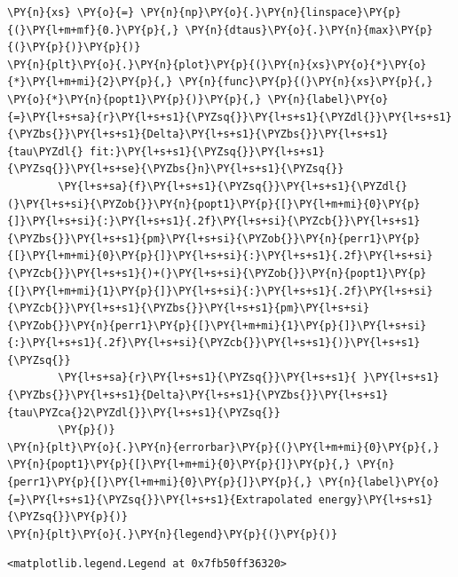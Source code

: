 \begin{tcolorbox}[breakable, size=fbox, boxrule=1pt, pad at break*=1mm,colback=cellbackground, colframe=cellborder]
\begin{Verbatim}[commandchars=\\\{\}]
\PY{n}{xs} \PY{o}{=} \PY{n}{np}\PY{o}{.}\PY{n}{linspace}\PY{p}{(}\PY{l+m+mf}{0.}\PY{p}{,} \PY{n}{dtaus}\PY{o}{.}\PY{n}{max}\PY{p}{(}\PY{p}{)}\PY{p}{)}
\PY{n}{plt}\PY{o}{.}\PY{n}{plot}\PY{p}{(}\PY{n}{xs}\PY{o}{*}\PY{o}{*}\PY{l+m+mi}{2}\PY{p}{,} \PY{n}{func}\PY{p}{(}\PY{n}{xs}\PY{p}{,} \PY{o}{*}\PY{n}{popt1}\PY{p}{)}\PY{p}{,} \PY{n}{label}\PY{o}{=}\PY{l+s+sa}{r}\PY{l+s+s1}{\PYZsq{}}\PY{l+s+s1}{\PYZdl{}}\PY{l+s+s1}{\PYZbs{}}\PY{l+s+s1}{Delta}\PY{l+s+s1}{\PYZbs{}}\PY{l+s+s1}{tau\PYZdl{} fit:}\PY{l+s+s1}{\PYZsq{}}\PY{l+s+s1}{\PYZsq{}}\PY{l+s+se}{\PYZbs{}n}\PY{l+s+s1}{\PYZsq{}}
        \PY{l+s+sa}{f}\PY{l+s+s1}{\PYZsq{}}\PY{l+s+s1}{\PYZdl{}(}\PY{l+s+si}{\PYZob{}}\PY{n}{popt1}\PY{p}{[}\PY{l+m+mi}{0}\PY{p}{]}\PY{l+s+si}{:}\PY{l+s+s1}{.2f}\PY{l+s+si}{\PYZcb{}}\PY{l+s+s1}{\PYZbs{}}\PY{l+s+s1}{pm}\PY{l+s+si}{\PYZob{}}\PY{n}{perr1}\PY{p}{[}\PY{l+m+mi}{0}\PY{p}{]}\PY{l+s+si}{:}\PY{l+s+s1}{.2f}\PY{l+s+si}{\PYZcb{}}\PY{l+s+s1}{)+(}\PY{l+s+si}{\PYZob{}}\PY{n}{popt1}\PY{p}{[}\PY{l+m+mi}{1}\PY{p}{]}\PY{l+s+si}{:}\PY{l+s+s1}{.2f}\PY{l+s+si}{\PYZcb{}}\PY{l+s+s1}{\PYZbs{}}\PY{l+s+s1}{pm}\PY{l+s+si}{\PYZob{}}\PY{n}{perr1}\PY{p}{[}\PY{l+m+mi}{1}\PY{p}{]}\PY{l+s+si}{:}\PY{l+s+s1}{.2f}\PY{l+s+si}{\PYZcb{}}\PY{l+s+s1}{)}\PY{l+s+s1}{\PYZsq{}}
        \PY{l+s+sa}{r}\PY{l+s+s1}{\PYZsq{}}\PY{l+s+s1}{ }\PY{l+s+s1}{\PYZbs{}}\PY{l+s+s1}{Delta}\PY{l+s+s1}{\PYZbs{}}\PY{l+s+s1}{tau\PYZca{}2\PYZdl{}}\PY{l+s+s1}{\PYZsq{}}
        \PY{p}{)}
\PY{n}{plt}\PY{o}{.}\PY{n}{errorbar}\PY{p}{(}\PY{l+m+mi}{0}\PY{p}{,} \PY{n}{popt1}\PY{p}{[}\PY{l+m+mi}{0}\PY{p}{]}\PY{p}{,} \PY{n}{perr1}\PY{p}{[}\PY{l+m+mi}{0}\PY{p}{]}\PY{p}{,} \PY{n}{label}\PY{o}{=}\PY{l+s+s1}{\PYZsq{}}\PY{l+s+s1}{Extrapolated energy}\PY{l+s+s1}{\PYZsq{}}\PY{p}{)}
\PY{n}{plt}\PY{o}{.}\PY{n}{legend}\PY{p}{(}\PY{p}{)}
\end{Verbatim}
\end{tcolorbox}

            \begin{tcolorbox}[breakable, size=fbox, boxrule=.5pt, pad at break*=1mm, opacityfill=0]
\begin{Verbatim}[commandchars=\\\{\}]
<matplotlib.legend.Legend at 0x7fb50ff36320>
\end{Verbatim}
\end{tcolorbox}
        
    \begin{center}
    \end{center}
    { \hspace*{\fill} \\}
    
